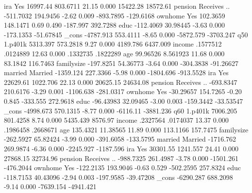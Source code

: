              {\VBAR}
         ira {\VBAR}
        Yes  {\VBAR}   16997.44   803.6711    21.15   0.000     15422.28    18572.61
             {\VBAR}
     pension {\VBAR}
Receives ..  {\VBAR}  -511.7032   194.9456    -2.62   0.009    -893.7895   -129.6168
             {\VBAR}
     ownhome {\VBAR}
        Yes  {\VBAR}   102.3659   148.1471     0.69   0.490     -187.997    392.7288
        educ {\VBAR}  -112.4069   30.98445    -3.63   0.000    -173.1353   -51.67845
       _cons {\VBAR}  -4787.913   553.4111    -8.65   0.000    -5872.579   -3703.247
q50          {\VBAR}
     1.p401k {\VBAR}   5313.397   573.2818     9.27   0.000     4189.786    6437.009
      income {\VBAR}   .1577512   .0124889    12.63   0.000     .1332735    .1822289
         age {\VBAR}   99.96526   8.561923    11.68   0.000      83.1842    116.7463
  familysize {\VBAR}  -197.8251   54.36773    -3.64   0.000    -304.3838   -91.26627
             {\VBAR}
     married {\VBAR}
    Married  {\VBAR}  -1359.124   227.3366    -5.98   0.000    -1804.696   -913.5528
             {\VBAR}
         ira {\VBAR}
        Yes  {\VBAR}   22629.61   1022.706    22.13   0.000     20625.15    24634.08
             {\VBAR}
     pension {\VBAR}
Receives ..  {\VBAR}  -693.8347   210.6176    -3.29   0.001    -1106.638   -281.0317
             {\VBAR}
     ownhome {\VBAR}
        Yes  {\VBAR}  -30.29657   154.7265    -0.20   0.845     -333.555    272.9618
        educ {\VBAR}  -96.43983   32.09465    -3.00   0.003    -159.3442   -33.53547
       _cons {\VBAR}  -4998.673   570.1315    -8.77   0.000     -6116.11   -3881.236
q60          {\VBAR}
     1.p401k {\VBAR}   7006.205   801.4258     8.74   0.000     5435.439     8576.97
      income {\VBAR}   .2327564   .0174037    13.37   0.000     .1986458    .2668671
         age {\VBAR}   135.4321   11.38565    11.89   0.000     113.1166    157.7475
  familysize {\VBAR}  -262.5927   65.82424    -3.99   0.000    -391.6058   -133.5795
             {\VBAR}
     married {\VBAR}
    Married  {\VBAR}  -1716.762   269.9874    -6.36   0.000    -2245.927   -1187.596
             {\VBAR}
         ira {\VBAR}
        Yes  {\VBAR}   30301.55   1241.557    24.41   0.000     27868.15    32734.96
             {\VBAR}
     pension {\VBAR}
Receives ..  {\VBAR}  -988.7325   261.4987    -3.78   0.000    -1501.261   -476.2044
             {\VBAR}
     ownhome {\VBAR}
        Yes  {\VBAR}  -122.2135   193.9046    -0.63   0.529    -502.2595    257.8324
        educ {\VBAR}  -118.7153   40.43096    -2.94   0.003    -197.9585   -39.47208
       _cons {\VBAR}  -6290.287   688.2098    -9.14   0.000    -7639.154   -4941.421
